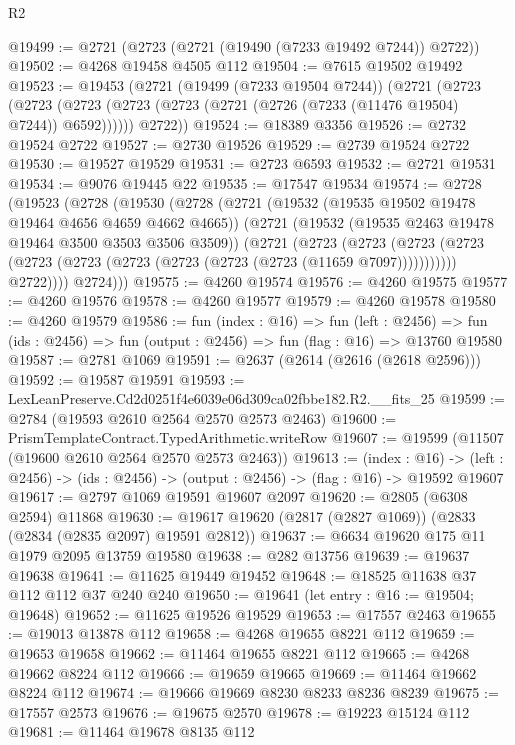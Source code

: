 \begin{lexlean}{R2}
\begin{coremodule}
@19499 := @2721 (@2723 (@2721 (@19490 (@7233 @19492 @7244)) @2722))
@19502 := @4268 @19458 @4505 @112
@19504 := @7615 @19502 @19492
@19523 := @19453
    (@2721
      (@19499 (@7233 @19504 @7244))
      (@2721
        (@2723 (@2723 (@2723 (@2723 (@2723 (@2721 (@2726 (@7233 (@11476 @19504) @7244)) @6592))))))
        @2722))
@19524 := @18389 @3356
@19526 := @2732 @19524 @2722
@19527 := @2730 @19526
@19529 := @2739 @19524 @2722
@19530 := @19527 @19529
@19531 := @2723 @6593
@19532 := @2721 @19531
@19534 := @9076 @19445 @22
@19535 := @17547 @19534
@19574 := @2728
    (@19523
      (@2728
        (@19530
          (@2728
            (@2721
              (@19532 (@19535 @19502 @19478 @19464 @4656 @4659 @4662 @4665))
              (@2721
                (@19532 (@19535 @2463 @19478 @19464 @3500 @3503 @3506 @3509))
                (@2721
                  (@2723
                    (@2723
                      (@2723
                        (@2723 (@2723 (@2723 (@2723 (@2723 (@2723 (@2723 (@11659 @7097)))))))))))
                  @2722))))
          @2724)))
@19575 := @4260 @19574
@19576 := @4260 @19575
@19577 := @4260 @19576
@19578 := @4260 @19577
@19579 := @4260 @19578
@19580 := @4260 @19579
@19586 := fun (index : @16) =>
  fun (left : @2456) =>
  fun (ids : @2456) => fun (output : @2456) => fun (flag : @16) => @13760 @19580
@19587 := @2781 @1069
@19591 := @2637 (@2614 (@2616 (@2618 @2596)))
@19592 := @19587 @19591
@19593 := LexLeanPreserve.Cd2d0251f4e6039e06d309ca02fbbe182.R2.__fits_25
@19599 := @2784 (@19593 @2610 @2564 @2570 @2573 @2463)
@19600 := PrismTemplateContract.TypedArithmetic.writeRow
@19607 := @19599 (@11507 (@19600 @2610 @2564 @2570 @2573 @2463))
@19613 := (index : @16) ->
  (left : @2456) -> (ids : @2456) -> (output : @2456) -> (flag : @16) -> @19592 @19607
@19617 := @2797 @1069 @19591 @19607 @2097
@19620 := @2805 (@6308 @2594) @11868
@19630 := @19617 @19620 (@2817 (@2827 @1069)) (@2833 (@2834 (@2835 @2097) @19591 @2812))
@19637 := @6634 @19620 @175 @11 @1979 @2095 @13759 @19580
@19638 := @282 @13756
@19639 := @19637 @19638
@19641 := @11625 @19449 @19452
@19648 := @18525 @11638 @37 @112 @112 @37 @240 @240
@19650 := @19641 (let entry : @16 := @19504; @19648)
@19652 := @11625 @19526 @19529
@19653 := @17557 @2463
@19655 := @19013 @13878 @112
@19658 := @4268 @19655 @8221 @112
@19659 := @19653 @19658
@19662 := @11464 @19655 @8221 @112
@19665 := @4268 @19662 @8224 @112
@19666 := @19659 @19665
@19669 := @11464 @19662 @8224 @112
@19674 := @19666 @19669 @8230 @8233 @8236 @8239
@19675 := @17557 @2573
@19676 := @19675 @2570
@19678 := @19223 @15124 @112
@19681 := @11464 @19678 @8135 @112

\end{coremodule}
\end{lexlean}
